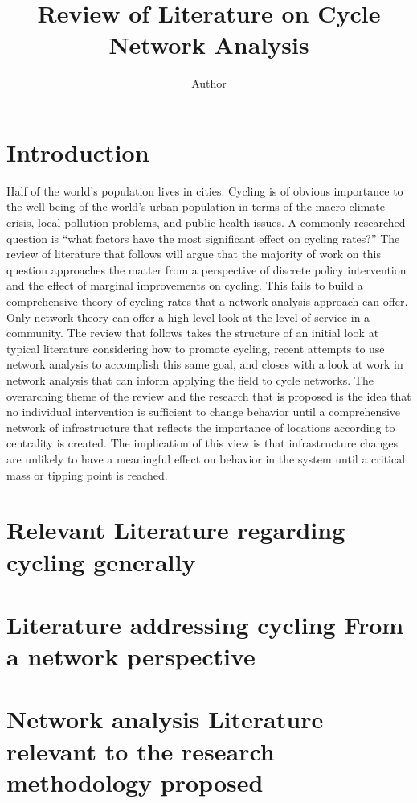\documentclass[11pt]{article} %
\title{\vspace{-3.0cm}Review of Literature on Cycle Network Analysis}
\author{Author}
\begin{document}
\maketitle


\section{Introduction}

Half of the world's population lives in cities. Cycling is of obvious importance to the well being of the world's  urban population in terms of the macro-climate crisis, local pollution problems, and public health issues. A commonly researched question is ``what factors have the most significant effect on cycling rates?'' The review of literature that follows will argue that the majority of work on this question approaches the matter from a perspective of discrete policy intervention and the effect of marginal improvements on cycling. This fails to build a comprehensive theory of cycling rates that a network analysis approach can offer. Only network theory can offer a high level look at the level of service in a community. The review that follows takes the structure of an initial look at typical literature considering how to promote cycling, recent attempts to use network analysis to accomplish this same goal, and closes with a look at work in network analysis that can inform applying the field to cycle networks. The overarching theme of the review and the research that is proposed is the idea that no individual intervention is sufficient to change behavior until a comprehensive network of infrastructure that reflects the importance of locations according to centrality is created. The implication of this view is that infrastructure changes are unlikely to have a meaningful effect on behavior in the system until a critical mass or tipping point is reached. 

\section{Relevant Literature regarding cycling generally}


\section{Literature addressing cycling From a network perspective}


\section{Network analysis Literature relevant to the research methodology proposed}
\end{document}
